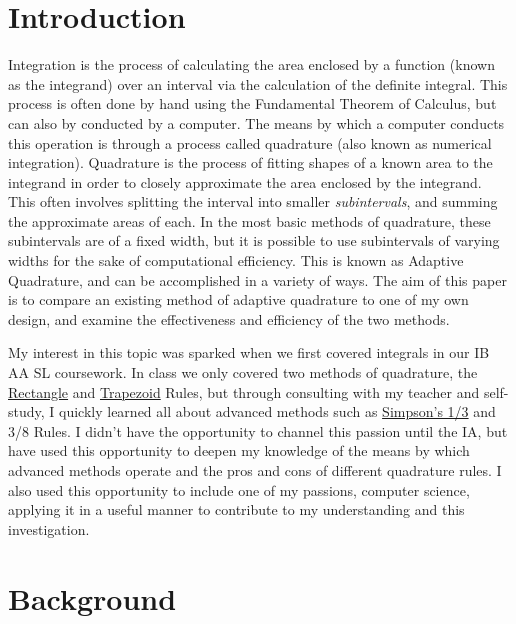 \documentclass{paper}
\begin{document}
\insertTitlePage
\tableofcontents
\thispagestyle{empty}
\newpage
\setcounter{page}{1}
\justifying

\section{Introduction}
\label{sec:intro}
Integration is the process of calculating the area enclosed by a function (known as the integrand) over an interval via the calculation of the definite integral.
This process is often done by hand using the Fundamental Theorem of Calculus, but can also by conducted by a computer.
The means by which a computer conducts this operation is through a process called quadrature (also known as numerical integration).
Quadrature is the process of fitting shapes of a known area to the integrand in order to closely approximate the area enclosed by the integrand.
This often involves splitting the interval into smaller \textit{subintervals}, and summing the approximate areas of each.
In the most basic methods of quadrature, these subintervals are of a fixed width, but it is possible to use subintervals of varying widths for the sake of computational efficiency.
This is known as Adaptive Quadrature, and can be accomplished in a variety of ways.
The aim of this paper is to compare an existing method of adaptive quadrature to one of my own design, and examine the effectiveness and efficiency of the two methods.

My interest in this topic was sparked when we first covered integrals in our IB AA SL coursework.
In class we only covered two methods of quadrature, the \hyperref[sec:rect_rule]{Rectangle} and \hyperref[sec:trap_rule]{Trapezoid} Rules, but through consulting with my teacher and self-study, I quickly learned all about advanced methods such as \hyperref[sec:smps_rule]{Simpson's 1/3} and 3/8 Rules.
I didn't have the opportunity to channel this passion until the IA, but have used this opportunity to deepen my knowledge of the means by which advanced methods operate and the pros and cons of different quadrature rules.
I also used this opportunity to include one of my passions, computer science, applying it in a useful manner to contribute to my understanding and this investigation.

\newpage %

\section{Background}
\label{sec:background}
\end{document}
